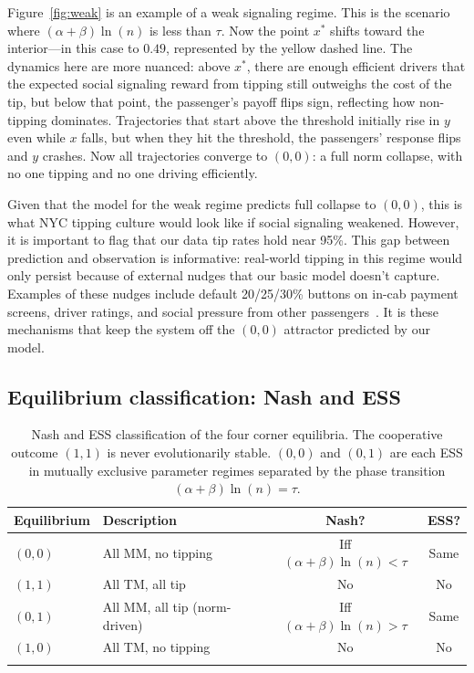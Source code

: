 \documentclass[pdflatex,sn-mathphys-num]{sn-jnl}%
\theoremstyle{thmstyleone}%
\theoremstyle{thmstyletwo}%
\theoremstyle{thmstylethree}%
\begin{document}
Figure~\ref{fig:weak} is an example of a weak signaling regime. This is the scenario where $(\alpha+\beta)\ln(n)$ is less than $\tau$. Now the point $x^*$ shifts toward the interior---in this case to $0.49$, represented by the yellow dashed line. The dynamics here are more nuanced: above $x^*$, there are enough efficient drivers that the expected social signaling reward from tipping still outweighs the cost of the tip, but below that point, the passenger's payoff flips sign, reflecting how non-tipping dominates. Trajectories that start above the threshold initially rise in $y$ even while $x$ falls, but when they hit the threshold, the passengers' response flips and $y$ crashes. Now all trajectories converge to $(0, 0)$: a full norm collapse, with no one tipping and no one driving efficiently.

Given that the model for the weak regime predicts full collapse to $(0, 0)$, this is what NYC tipping culture would look like if social signaling weakened. However, it is important to flag that our data tip rates hold near 95\%. This gap between prediction and observation is informative: real-world tipping in this regime would only persist because of external nudges that our basic model doesn't capture. Examples of these nudges include default 20/25/30\% buttons on in-cab payment screens, driver ratings, and social pressure from other passengers~\cite{haggag2014}. It is these mechanisms that keep the system off the $(0, 0)$ attractor predicted by our model.

\subsection{Equilibrium classification: Nash and ESS}\label{sec:ess}

\begin{table}[h]
\caption{Nash and ESS classification of the four corner equilibria. The cooperative outcome $(1, 1)$ is never evolutionarily stable. $(0, 0)$ and $(0, 1)$ are each ESS in mutually exclusive parameter regimes separated by the phase transition $(\alpha+\beta)\ln(n) = \tau$.}\label{tab:ess}
\begin{tabular}{@{}llcc@{}}
\toprule
Equilibrium & Description & Nash? & ESS? \\
\midrule
$(0, 0)$ & All MM, no tipping & Iff $(\alpha+\beta)\ln(n) < \tau$ & Same \\
$(1, 1)$ & All TM, all tip & No & No \\
$(0, 1)$ & All MM, all tip (norm-driven) & Iff $(\alpha+\beta)\ln(n) > \tau$ & Same \\
$(1, 0)$ & All TM, no tipping & No & No \\
\botrule
\end{tabular}
\end{table}
\end{document}
